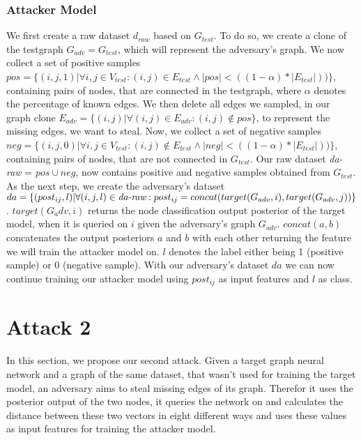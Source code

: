       \subsubsection{Attacker Model}

        We first create a raw dataset $d_{raw}$ based on $G_{test}$.
        To do so, we create a clone of the testgraph $G_{adv} = G_{test}$, which will represent the adversary's graph.
        We now collect a set of positive samples $pos = \{(i,j, 1) | \forall i,j \in V_{test}: (i,j) \in E_{test} \wedge |pos| < ((1 - \alpha) * |E_{test}|))\}$, containing pairs of nodes, that are connected in the testgraph, where $\alpha$ denotes the percentage of known edges.
        We then delete all edges we sampled, in our graph clone $E_{adv} = \{(i,j) | \forall (i,j) \in E_{adv}: (i,j) \not\in pos\}$, to represent the missing edges, we want to steal.
        Now, we collect a set of negative samples $neg = \{(i,j, 0) | \forall i,j \in V_{test}: (i,j) \not\in E_{test} \wedge |neg| < ((1 - \alpha) * |E_{test}|))\}$, containing pairs of nodes, that are not connected in $G_{test}$.
        Our raw dataset \emph{da-raw} = $pos \cup neg$, now contains positive and negative samples obtained from $G_{test}$.
        As the next step, we create the adversary's dataset $da = \{(post_{ij}, l) | \forall (i,j,l)\in\emph{da-raw}: post_{ij} = concat(target(G_{adv}, i), target(G_{adv}, j))\}$.
        $target(G_adv, i)$ returns the node classification output posterior of the target model, when it is queried on $i$ given the adversary's graph $G_{adv}$.
        $concat(a, b)$ concatenates the output posteriors $a$ and $b$ with each other returning the feature we will train the attacker model on.
        $l$ denotes the label either being 1 (positive sample) or 0 (negative sample).
        With our adversary's dataset $da$ we can now continue training our attacker model using $post_{ij}$ as input features and $l$ as class.

  \section{Attack 2}

    In this section, we propose our second attack. Given a target graph neural network and a graph of the same dataset, that wasn't used for training the target model, an adversary aims to steal missing edges of its graph.
    Therefor it uses the posterior output of the two nodes, it queries the network on and calculates the distance between these two vectors in eight different ways and uses these values as input features for training the attacker model.

